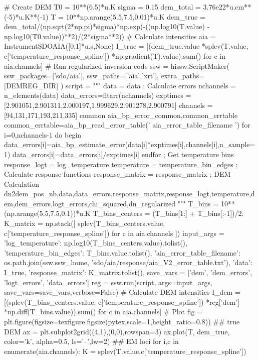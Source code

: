 \begin{pycode}
# Create DEM
T0 = 10**(6.5)*u.K
sigma = 0.15
dem_total = 3.76e22*u.cm**(-5)*u.K**(-1)
T = 10**np.arange(5.5,7.5,0.01)*u.K
dem_true = dem_total/(np.sqrt(2*np.pi)*sigma)*np.exp(-((np.log10(T.value) - np.log10(T0.value))**2)/(2*sigma**2))
# Calculate intensities
aia = InstrumentSDOAIA([0,1]*u.s,None)
I_true = [(dem_true.value
           *splev(T.value, c['temperature_response_spline'])
           *np.gradient(T).value).sum()
          for c in aia.channels]
# Run regularized inversion code
ssw = hissw.ScriptMaker(
    ssw_packages=['sdo/aia'],
    ssw_paths=['aia','xrt'],
    extra_paths=[DEMREG_DIR]
)
script = """
data = {{data}}
; Calculate errors
nchannels = n_elements(data)
data_errors=fltarr(nchannels)
exptimes = [2.901051,2.901311,2.000197,1.999629,2.901278,2.900791]
channels = [94,131,171,193,211,335]
common aia_bp_error_common,common_errtable
common_errtable=aia_bp_read_error_table('{{ aia_error_table_filename }}')
for i=0,nchannels-1 do begin
    data_errors[i]=aia_bp_estimate_error(data[i]*exptimes[i],channels[i],n_sample=1)
    data_errors[i]=data_errors[i]/exptimes[i]
endfor
; Get temperature bins
response_logt = {{log_temperature}}
temperature = {{temperature_bin_edges}}
; Calculate response functions
response_matrix = {{ response_matrix }}
; DEM Calculation
dn2dem_pos_nb,data,data_errors,response_matrix,response_logt,temperature,dem,dem_errors,logt_errors,chi_squared,dn_regularized
"""
T_bins = 10**(np.arange(5.5,7.5,0.1))*u.K
T_bins_centers = (T_bins[1:] + T_bins[:-1])/2.
K_matrix = np.stack([
    splev(T_bins_centers.value, c['temperature_response_spline']) for c in aia.channels
])
input_args =  {
    'log_temperature': np.log10(T_bins_centers.value).tolist(),
    'temperature_bin_edges': T_bins.value.tolist(),
    'aia_error_table_filename': os.path.join(ssw.ssw_home, 'sdo/aia/response/aia_V2_error_table.txt'),
    'data': I_true,
    'response_matrix': K_matrix.tolist(),
}
save_vars = ['dem', 'dem_errors', 'logt_errors', 'data_errors']
reg = ssw.run(script, args=input_args, save_vars=save_vars,verbose=False)
# Calculate DEM intensities
I_dem = [(splev(T_bins_centers.value, c['temperature_response_spline'])
          *reg['dem']
          *np.diff(T_bins.value)).sum() for c in aia.channels]
# Plot
fig = plt.figure(figsize=texfigure.figsize(pytex,scale=1,height_ratio=0.8))
## true DEM
ax = plt.subplot2grid((4,1),(0,0),rowspan=3)
ax.plot(T, dem_true, color='k', alpha=0.5, ls='--',lw=2)
## EM loci
for i,c in enumerate(aia.channels):
    K = splev(T.value,c['temperature_response_spline'])

\end{pycode}
